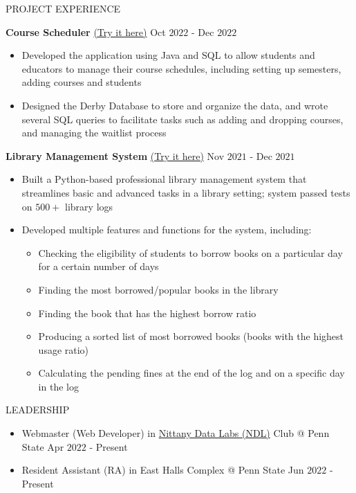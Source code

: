 \documentclass{resume} %
\begin{document}
\begin{rSection}{PROJECT EXPERIENCE}

\textbf{Course Scheduler }{\href{https://github.com/harshitjain17/OOP-with-Web-based-Applications-in-Java-/tree/main/CourseSchedulerHarshitJainhmj5262}{(Try it here)}} \hfill Oct $2022$ - Dec $2022$
\begin{itemize}
    \itemsep -3pt {}
    \item Developed the application using Java and SQL to allow students and educators to manage their course schedules, including setting up semesters, adding courses and students
    \item Designed the Derby Database to store and organize the data, and wrote several SQL queries to facilitate tasks such as adding and dropping courses, and managing the waitlist process
\end{itemize}


\textbf{Library Management System }{\href{https://github.com/harshitjain17/Library-Management-System}{(Try it here)}} \hfill Nov $2021$ - Dec $2021$
\begin{itemize}
    \itemsep -3pt {}
    \item Built a Python-based professional library management system that streamlines basic and advanced tasks in a library setting; system passed tests on $500+$ library logs
    \item Developed multiple features and functions for the system, including:
    \begin{itemize}
        \itemsep -3pt {}
        \item Checking the eligibility of students to borrow books on a particular day for a certain number of days
        \item Finding the most borrowed/popular books in the library
        \item Finding the book that has the highest borrow ratio
        \item Producing a sorted list of most borrowed books (books with the highest usage ratio)
        \item Calculating the pending fines at the end of the log and on a specific day in the log
    \end{itemize}
\end{itemize}

\end{rSection} 


\begin{rSection}{LEADERSHIP} 
\begin{itemize}
    \item Webmaster (Web Developer) in \href{https://ndl.psu.edu/}{Nittany Data Labs (NDL)} Club @ Penn State \hfill Apr $2022$ - Present
    \item Resident Assistant (RA) in East Halls Complex @ Penn State \hfill Jun $2022$ - Present
\end{itemize}


\end{rSection}
\end{document}
